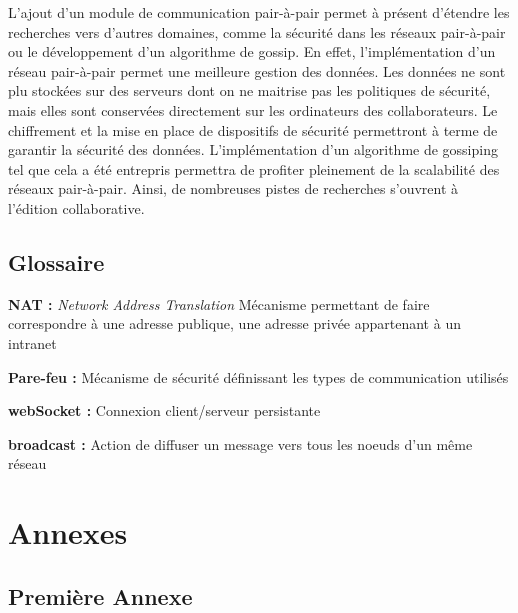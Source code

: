 \documentclass{tnreport}
\begin{document}
L'ajout d'un module de communication pair-à-pair permet à présent d'étendre les recherches vers d'autres domaines, comme la sécurité dans les réseaux pair-à-pair ou le développement d'un algorithme de gossip. En effet, l'implémentation d'un réseau pair-à-pair permet une meilleure gestion des données. Les données ne sont plu stockées sur des serveurs dont on ne maitrise pas les politiques de sécurité, mais elles sont conservées directement sur les ordinateurs des collaborateurs. Le chiffrement et la mise en place de dispositifs de sécurité permettront à terme de garantir la sécurité des données. L'implémentation d'un algorithme de gossiping tel que cela a été entrepris permettra de profiter pleinement de la scalabilité des réseaux pair-à-pair. Ainsi, de nombreuses pistes de recherches s'ouvrent à l'édition collaborative. 

\cleardoublepage

\renewcommand{\tocbibname}{Bibliographie / Webographie}

\nocite{*}


\cleardoublepage

\listoffigures
\cleardoublepage


\chapter*{Glossaire}
\textbf{NAT : }\emph{Network Address Translation} Mécanisme permettant de faire correspondre à une adresse publique, une adresse privée appartenant à un intranet 

\textbf{Pare-feu :} Mécanisme de sécurité définissant les types de communication utilisés

\textbf{webSocket :} Connexion client/serveur persistante

\textbf{broadcast :} Action de diffuser un message vers tous les noeuds d'un même réseau


\cleardoublepage
\renewcommand{\thesubsection}{\Roman{subsection}}

\appendix
\part*{Annexes}
\cleardoublepage

\chapter{Première Annexe}
\end{document}
